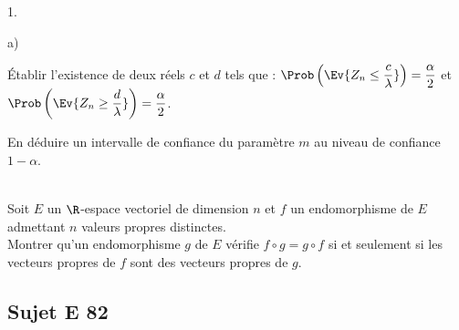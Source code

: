\documentclass[11pt]{article}
\begin{document}
\begin{exerciceAP}
\begin{noliste}{1.}
\begin{noliste}{a)}
    \item Établir l'existence de deux réels $c$ et $d$ tels que : 
    $\Prob\left(\Ev{ Z_n \leq \dfrac{c}{\lambda}}\right) = 
    \dfrac{\alpha}{2}$ et $\Prob\left(\Ev{ Z_n \geq 
    \dfrac{d}{\lambda}}\right)=\dfrac{\alpha}{2}$.
    
    \item En déduire un intervalle de confiance du paramètre $m$ au 
    niveau de confiance $1-\alpha$.
  \end{noliste}
\end{noliste}
\end{exerciceAP}



\begin{exerciceSP}~\\
Soit $E$ un $\R$-espace vectoriel de dimension $n$ et $f$ un 
endomorphisme de $E$ admettant $n$ valeurs propres distinctes.\\
Montrer qu'un endomorphisme $g$ de $E$ vérifie $f\circ g = g\circ f$ si 
et seulement si les vecteurs propres de $f$ sont des vecteurs propres 
de $g$.
\end{exerciceSP}



\newpage



\subsection*{Sujet E 82}

\end{document}
